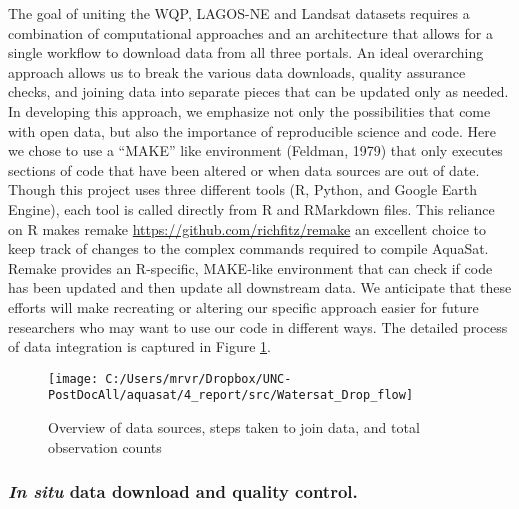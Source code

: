 \documentclass[]{article}
\begin{document}
The goal of uniting the WQP, LAGOS-NE and Landsat datasets requires a
combination of computational approaches and an architecture that allows
for a single workflow to download data from all three portals. An ideal
overarching approach allows us to break the various data downloads,
quality assurance checks, and joining data into separate pieces that can
be updated only as needed. In developing this approach, we emphasize not
only the possibilities that come with open data, but also the importance
of reproducible science and code. Here we chose to use a ``MAKE'' like
environment (Feldman, 1979) that only executes sections of code that
have been altered or when data sources are out of date. Though this
project uses three different tools (R, Python, and Google Earth Engine),
each tool is called directly from R and RMarkdown files. This reliance
on R makes remake \url{https://github.com/richfitz/remake} an excellent
choice to keep track of changes to the complex commands required to
compile AquaSat. Remake provides an R-specific, MAKE-like environment
that can check if code has been updated and then update all downstream
data. We anticipate that these efforts will make recreating or altering
our specific approach easier for future researchers who may want to use
our code in different ways. The detailed process of data integration is
captured in Figure \ref{fig:fig1}.

\begin{figure}
\texttt{[image: C:/Users/mrvr/Dropbox/UNC-PostDocAll/aquasat/4\_report/src/Watersat\_Drop\_flow]} \caption{Overview of data sources, steps taken to join data, and total observation counts}\label{fig:fig1}
\end{figure}

\hypertarget{in-situ-data-download-and-quality-control.}{%
\subsubsection{\texorpdfstring{\emph{In situ} data download and quality
control.}{In situ data download and quality control.}}\label{in-situ-data-download-and-quality-control.}}
\end{document}
